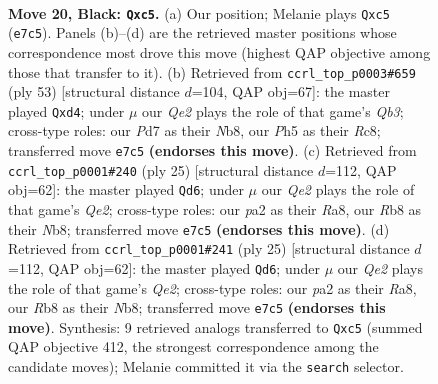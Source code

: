 \documentclass[11pt]{article}
\begin{document}
\clearpage

\begin{figure}[p]\centering
\begin{subfigure}{0.46\textwidth}\centering
\resizebox{\linewidth}{!}{%
\newchessgame
\chessboard[
  setfen={1rb2r2/p1ppqp2/2n1p2k/2Q4p/6p1/2B2NP1/PP2PP1P/2R1KB1R b - - 0 20},
  showmover=false,
  pgfstyle=straightmove, color=movearrow, markmove={e7-c5}
]}
\caption{}
\end{subfigure}\hfill
\begin{subfigure}{0.46\textwidth}\centering
\resizebox{\linewidth}{!}{%
\newchessgame
\chessboard[
  setfen={1nr2rk1/4b2p/pq2pppP/1p1n2P1/3Q4/1P2PN2/R2B1PB1/1R4K1 b - - 0 27},
  showmover=false,
  pgfstyle=straightmove, color=movearrow, markmove={b6-d4}
]}
\caption{}
\end{subfigure}
\\[4pt]
\begin{subfigure}{0.46\textwidth}\centering
\resizebox{\linewidth}{!}{%
\newchessgame
\chessboard[
  setfen={rnbr2k1/pp2qpbp/6p1/2p3Q1/4P2P/2B2P2/PP2N1P1/R3KB1R b KQ - 2 13},
  showmover=false,
  pgfstyle=straightmove, color=movearrow, markmove={e7-d6}
]}
\caption{}
\end{subfigure}\hfill
\begin{subfigure}{0.46\textwidth}\centering
\resizebox{\linewidth}{!}{%
\newchessgame
\chessboard[
  setfen={rnbr2k1/pp2qpbp/6p1/2p3Q1/4P2P/2B2P2/PP2N1P1/R3KB1R b KQ - 2 13},
  showmover=false,
  pgfstyle=straightmove, color=movearrow, markmove={e7-d6}
]}
\caption{}
\end{subfigure}
\caption{\textbf{Move 20, Black: \texttt{Qxc5}.} (a) Our position; Melanie plays \texttt{Qxc5} (\texttt{e7c5}). Panels (b)--(d) are the retrieved master positions whose correspondence most drove this move (highest QAP objective among those that transfer to it). (b) Retrieved from \texttt{ccrl\_top\_p0003\#659} (ply 53) [structural distance $d$=104, QAP obj=67]: the master played \texttt{Qxd4}; under $\mu$ our \emph{Qe2} plays the role of that game's \emph{Qb3}; cross-type roles: our \emph{P}d7 as their \emph{N}b8, our \emph{P}h5 as their \emph{R}c8; transferred move \texttt{e7c5} \textbf{(endorses this move)}. (c) Retrieved from \texttt{ccrl\_top\_p0001\#240} (ply 25) [structural distance $d$=112, QAP obj=62]: the master played \texttt{Qd6}; under $\mu$ our \emph{Qe2} plays the role of that game's \emph{Qe2}; cross-type roles: our \emph{p}a2 as their \emph{R}a8, our \emph{R}b8 as their \emph{N}b8; transferred move \texttt{e7c5} \textbf{(endorses this move)}. (d) Retrieved from \texttt{ccrl\_top\_p0001\#241} (ply 25) [structural distance $d$=112, QAP obj=62]: the master played \texttt{Qd6}; under $\mu$ our \emph{Qe2} plays the role of that game's \emph{Qe2}; cross-type roles: our \emph{p}a2 as their \emph{R}a8, our \emph{R}b8 as their \emph{N}b8; transferred move \texttt{e7c5} \textbf{(endorses this move)}. Synthesis: 9 retrieved analogs transferred to \texttt{Qxc5} (summed QAP objective 412, the strongest correspondence among the candidate moves); Melanie committed it via the \texttt{search} selector.}
\label{fig:thought-m39}
\end{figure}
\end{document}
